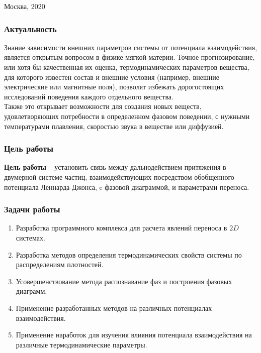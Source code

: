\documentclass[pdf,hyperref={unicode}]{beamer}
\begin{document}
\begin{frame}
\begin{columns}
\begin{column}{0.50\textwidth}
                \end{column}
        \end{columns}
        
    
\vspace{1cm}
\begin{center}
\tiny Москва, $2020$
\end{center}
\end{frame}






\begin{frame}
	\transdissolve[duration=0.2]
	\frametitle{Актуальность}
	
	\small{
	
Знание зависимости внешних параметров системы от потенциала взаимодействия, является открытым вопросом в физике мягкой материи. Точное прогнозирование, или хотя бы качественная их оценка, термодинамических параметров вещества, для которого известен состав и внешние условия (например, внешние электрические или магнитные поля), позволят избежать дорогостоящих исследований поведения каждого отдельного вещества. 
\\
Также это открывает возможности для создания новых веществ, удовлетворяющих потребности в определенном фазовом поведении, с нужными температурами плавления, скоростью звука в веществе или диффузией.
	}

\end{frame}

\begin{frame}
	\transdissolve[duration=0.2]
	\frametitle{Цель работы}
\small{
\textbf{Цель работы} --
установить связь между дальнодействием притяжения в двумерной системе частиц, взаимодействующих посредством обобщенного потенциала Леннарда-Джонса, c фазовой диаграммой, и параметрами переноса.
	}
\end{frame}



\begin{frame}
	\transdissolve[duration=0.2]
	\frametitle{Задачи работы}
	\small{
\begin{enumerate}
\item Разработка программного комплекса для расчета явлений переноса в $2D$ системах.
\item Разработка методов определения термодинамических свойств системы по распределениям плотностей. 
\item Усовершенствование метода распознавание фаз и построения фазовых диаграмм.
\item Применение разработанных методов на различных потенциалах взаимодействия.
\item Применение наработок для изучения влияния потенциала взаимодействия на различные термодинамические параметры.
\end{enumerate}
	}
\end{frame}
\end{document}
